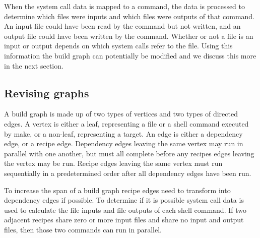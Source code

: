 \documentclass[sigconf,10pt,review,authorversion]{acmart}\settopmatter{printfolios=true,printccs=false,printacmref=false}
\begin{document}
When the system call data is mapped to a command, the data is processed to determine which
files were inputs and which files were outputs of that command.  An input file could have been
read by the command but not written, and an output file could have been written by the command.
Whether or not a file is an input or output depends on which system calls refer to the file.
Using this information the build graph can potentially be modified and we discuss this more
in the next section.




\subsection{Revising graphs}
\label{sec:revisegraphs}

A build graph is made up of two types of vertices and two types of directed edges.  A vertex is
either a leaf, representing a file or a shell command executed by make, or a non-leaf,
representing a target.  An edge is either a dependency edge, or a recipe edge.
Dependency edges leaving the same vertex may run in parallel with one another, but must all
complete before any recipes edges leaving the vertex may be run.  Recipe edges leaving the same
vertex must run sequentially in a predetermined order after all dependency edges have been run.

To increase the span of a build graph recipe edges need to transform into dependency
edges if possible.  To determine if it is possible system call data is used to calculate the
file inputs and file outputs of each shell command.  If two adjacent recipes share zero or more
input files and share no input and output files, then those two commands can run in parallel.
\end{document}
